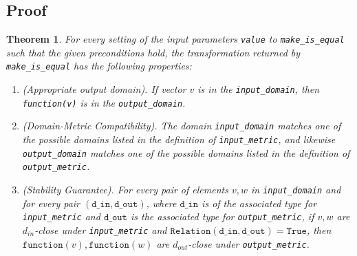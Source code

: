 \documentclass[11pt,a4paper]{article}
\newtheorem{theorem}{Theorem}[section]
\newcommand{\din}{\texttt{d\_in}}
\newcommand{\dout}{\texttt{d\_out}}
\newcommand{\Relation}{\texttt{Relation}}
\newcommand{\True}{\texttt{True}}
\newcommand{\function}{\texttt{function}}
\begin{document}
\subsection{Proof}
\begin{theorem}


For every setting of the input parameters \texttt{value} to \texttt{make\_is\_equal} such that the given preconditions hold, the transformation returned by \texttt{make\_is\_equal} has the following properties:
\begin{enumerate}
    \item \textup{(Appropriate output domain).} If vector $v$ is in the \texttt{input\_domain}, then \texttt{function(v)} is in the \texttt{output\_domain}.
    \item \textup{(Domain-Metric Compatibility).} The domain \texttt{input\_domain} matches one of the possible domains listed in the definition of \texttt{input\_metric}, and likewise \texttt{output\_domain} matches one of the possible domains listed in the definition of \texttt{output\_metric}.
    \item \textup{(Stability Guarantee).} For every pair of elements $v, w$ in \texttt{input\_domain} and for every pair $(\din, \dout)$, where $\din$ is of the associated type for \texttt{input\_metric} and $\dout$ is the associated type for \texttt{output\_metric}, if $v,w$ are $d_{in}$-close under \texttt{input\_metric} and $\Relation(\din, \dout) = \True$, then $\function(v), \function(w)$ are $d_{out}$-close under \texttt{output\_metric}.
\end{enumerate}
\end{theorem}
\end{document}
